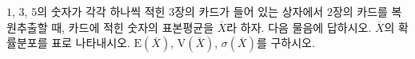 $1$, $3$, $5$의 숫자가 각각 하나씩 적힌 $3$장의 카드가 들어 있는 상자에서 $2$장의 카드를 복원추출할 때, 카드에 적힌 숫자의 표본평균을 $\overline{X}$라 하자. 다음 물음에 답하시오.
 $\overline{X}$의 확률분포를 표로 나타내시오.
 $\mathrm{E}(\overline{X})$, $\mathrm{V}(\overline{X})$, $\sigma(\overline{X})$를 구하시오.
